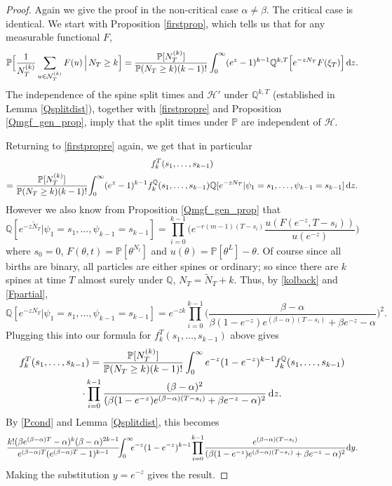 \documentclass{article}
\theoremstyle{plain}
\theoremstyle{definition}
\newcommand{\Q}{\mathbb{Q}}
\renewcommand{\P}{\mathbb{P}}
\newcommand{\Nc}{\mathcal{N}}
\renewcommand{\d}{{\rm{d}}}
\begin{document}
\begin{proof}
Again we give the proof in the non-critical case $\alpha\neq\beta$. The critical case is identical. We start with Proposition \ref{firstprop}, which tells us that for any measurable functional $F$,
\begin{equation}\label{firstpropre}
\P\Big[\frac{1}{N_T^{(k)}} \sum_{u\in \Nc_T^{(k)}} F(u) \, \Big| \, N_T \ge k\Big] = \frac{\P[N_T^{(k)}]}{\P(N_T\ge k)(k-1)!} \int_0^\infty (e^z-1)^{k-1} \Q^{k,T}\Big[e^{-zN_T} F(\xi_T)\Big]\,\d z.
\end{equation}
The independence of the spine split times and $\mathcal H'$ under $\Q^{k,T}$ (established in Lemma \ref{Qsplitdist}), together with \eqref{firstpropre} and Proposition \ref{Qmgf_gen_prop}, imply that the split times under $\P$ are independent of $\mathcal H$.

Returning to \eqref{firstpropre} again, we get that in particular
\begin{multline*}
f_k^T(s_1,\ldots, s_{k-1})\\
= \frac{\P[N_T^{(k)}]}{\P(N_T\ge k)(k-1)!} \hspace{-0.5mm}\int_0^\infty (e^z-1)^{k-1} f^\Q_k(s_1,\ldots,s_{k-1})\Q[e^{-zN_T}|\psi_1 = s_1,\ldots,\psi_{k-1}=s_{k-1}] \,\d z.
\end{multline*}
However we also know from Proposition \ref{Qmgf_gen_prop} that
\[\Q[e^{-z\tilde N_T}|\psi_1 = s_1,\ldots,\psi_{k-1}=s_{k-1}] = \prod_{i=0}^{k-1}\Big(e^{-r(m-1)(T-s_i)}\frac{u(F(e^{-z},T-s_i))}{u(e^{-z})}\Big)\]
where $s_0=0$, $F(\theta,t) = \P[\theta^{N_t}]$ and $u(\theta) = \P[\theta^L]-\theta$.
Of course since all births are binary, all particles are either spines or ordinary; so since there are $k$ spines at time $T$ almost surely under $\Q$, $N_T = \tilde N_T + k$. Thus, by \eqref{kolback} and \eqref{Fpartial},
\[\Q[e^{-zN_T}|\psi_1 = s_1,\ldots,\psi_{k-1}=s_{k-1}] = e^{-zk} \prod_{i=0}^{k-1} \Big( \frac{\beta-\alpha}{\beta(1-e^{-z})e^{(\beta-\alpha)(T-s_i)} + \beta e^{-z}-\alpha}\Big)^2.\]
Plugging this into our formula for $f_k^T(s_1,\ldots, s_{k-1})$ above gives
\begin{multline*}
f_k^T(s_1,\ldots, s_{k-1}) = \frac{\P[N_T^{(k)}]}{\P(N_T\ge k)(k-1)!} \int_0^\infty e^{-z}(1-e^{-z})^{k-1} f^\Q_k(s_1,\ldots,s_{k-1})\\
\cdot\prod_{i=0}^{k-1} \frac{(\beta-\alpha)^2}{(\beta(1-e^{-z})e^{(\beta-\alpha)(T-s_i)}+\beta e^{-z} - \alpha)^2}\,\d z.
\end{multline*}
By \eqref{Pcond} and Lemma \ref{Qsplitdist}, this becomes
\[\frac{k!(\beta e^{(\beta-\alpha)T}-\alpha)^k(\beta-\alpha)^{2k-1}}{e^{(\beta-\alpha)T}(e^{(\beta-\alpha)T}-1)^{k-1}}\hspace{-1.5mm} \int_0^\infty \hspace{-1.8mm} e^{-z}(1-e^{-z})^{k-1} \hspace{-0.5mm}\prod_{i=0}^{k-1}\hspace{-0.5mm}  \frac{e^{(\beta-\alpha)(T-s_i)}}{(\beta(1-e^{-z})e^{(\beta-\alpha)(T-s_i)}+\beta e^{-z} - \alpha)^2}\d y.\]
Making the substitution $y=e^{-z}$ gives the result.
\end{proof}
\end{document}
